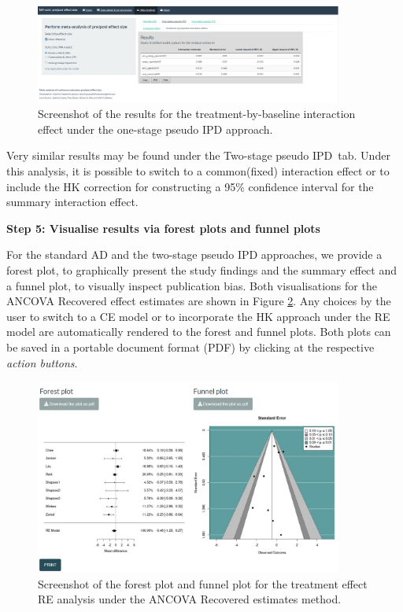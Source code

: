 \documentclass[AMA,STIX1COL]{WileyNJD-v2}
\begin{document}
\begin{figure} [t] 
  \centering \includegraphics[width=0.9\textwidth]{One_stage_int_effect_shiny.jpeg}
    \caption{\small {Screenshot of the results for the treatment-by-baseline interaction effect under the one-stage pseudo IPD approach.}} \label{fig:shiny-one-int}
\end{figure}

Very similar results may be found under the \textquotesingle Two-stage pseudo IPD\textquotesingle\ tab. Under this analysis, it is possible to switch to a common(fixed) interaction effect {\color{blue}or} to include the HK correction for constructing a 95\% confidence interval for the summary interaction effect.

\newpage
\vspace{0.1cm}
\textbf{Step 5: Visualise results via forest plots and funnel plots}
\vspace{0.1cm}

For the standard AD and the two-stage pseudo IPD approaches, we provide a forest plot, to graphically present the study findings and the summary effect and a funnel plot, to visually inspect publication bias. Both visualisations for the ANCOVA Recovered effect estimates are shown in Figure \ref{fig:shiny-forest_funnel}. Any choices by the user to switch to a CE model or to incorporate the HK approach under the RE model are automatically rendered to the forest and funnel plots. Both plots can be saved in a portable document format (PDF) by clicking at the respective \textit{action buttons}.

\begin{figure} [t]
  \centering \includegraphics[width=0.9\textwidth]{forest_funnel.JPG}
    \caption{\small {Screenshot of the forest plot and funnel plot for the treatment effect RE analysis under the ANCOVA Recovered estimates method.}} \label{fig:shiny-forest_funnel}
\end{figure}
\end{document}
